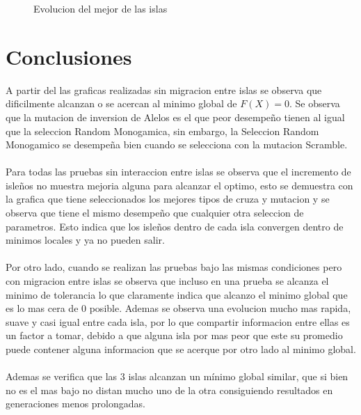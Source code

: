 \documentclass[10pt,letterpaper]{article}
\begin{document}
\begin{figure}[H]
      \begin{center}
        \caption{Evolucion del mejor de las islas}
        \label{Patron de señales para reconocimiento de señal Gaussiana}
      \end{center}
    \end{figure}

\section{Conclusiones}
A partir del las graficas realizadas sin migracion entre islas se observa que dificilmente alcanzan o se acercan al minimo global de $F(X)= 0$. Se observa que la mutacion de inversion de Alelos es el que peor desempeño tienen al igual que la seleccion Random Monogamica, sin embargo, la Seleccion Random Monogamico se desempeña bien cuando se selecciona con la mutacion Scramble. 
\\\\
Para todas las pruebas sin interaccion entre islas se observa que el incremento de isleños no muestra mejoria alguna para alcanzar el optimo, esto se demuestra con la grafica que tiene seleccionados los mejores tipos de cruza y mutacion y se observa que tiene el mismo desempeño que cualquier otra seleccion de parametros. Esto indica que los isleños dentro de cada isla convergen dentro de minimos locales y ya no pueden salir.
\\\\
Por otro lado, cuando se realizan las pruebas bajo las mismas condiciones pero con migracion entre islas se observa que incluso en una prueba se alcanza el minimo de tolerancia lo que claramente indica que alcanzo el minimo global que es lo mas cera de 0 posible. Ademas se observa una evolucion mucho mas rapida, suave y casi igual entre cada isla, por lo que compartir informacion entre ellas es un factor a tomar, debido a que alguna isla por mas peor que este su promedio puede contener alguna informacion que se acerque por otro lado al minimo global.
\\\\
Ademas se verifica que las 3 islas alcanzan un mínimo global similar, que si bien no es el mas bajo no distan mucho uno de la otra consiguiendo resultados en generaciones menos prolongadas.
\end{document}
